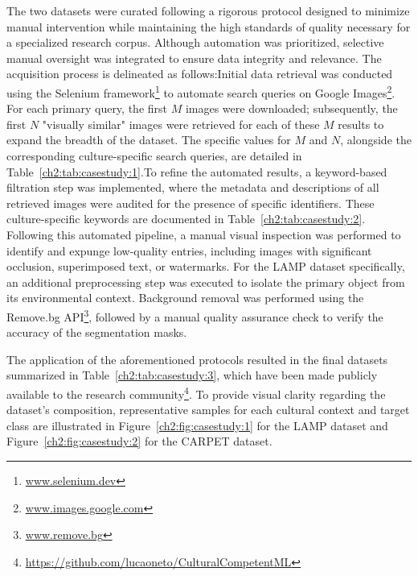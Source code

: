 The two datasets were curated following a rigorous protocol designed to minimize manual intervention while maintaining the high standards of quality necessary for a specialized research corpus. 
Although automation was prioritized, selective manual oversight was integrated to ensure data integrity and relevance. 
The acquisition process is delineated as follows:Initial data retrieval was conducted using the Selenium framework\footnote{\url{www.selenium.dev}} to automate search queries on Google Images\footnote{\url{www.images.google.com}}. 
For each primary query, the first $M$ images were downloaded; subsequently, the first $N$ "visually similar" images were retrieved for each of these $M$ results to expand the breadth of the dataset. The specific values for $M$ and $N$, alongside the corresponding culture-specific search queries, are detailed in Table~\ref{ch2:tab:casestudy:1}.To refine the automated results, a keyword-based filtration step was implemented, where the metadata and descriptions of all retrieved images were audited for the presence of specific identifiers. 
These culture-specific keywords are documented in Table~\ref{ch2:tab:casestudy:2}.
Following this automated pipeline, a manual visual inspection was performed to identify and expunge low-quality entries, including images with significant occlusion, superimposed text, or watermarks. 
For the LAMP dataset specifically, an additional preprocessing step was executed to isolate the primary object from its environmental context. 
Background removal was performed using the Remove.bg API\footnote{\url{www.remove.bg}}, followed by a manual quality assurance check to verify the accuracy of the segmentation masks.

The application of the aforementioned protocols resulted in the final datasets summarized in Table~\ref{ch2:tab:casestudy:3}, which have been made publicly available to the research community\footnote{\url{https://github.com/lucaoneto/CulturalCompetentML}}. 
To provide visual clarity regarding the dataset's composition, representative samples for each cultural context and target class are illustrated in Figure~\ref{ch2:fig:casestudy:1} for the LAMP dataset and Figure~\ref{ch2:fig:casestudy:2} for the CARPET dataset.

